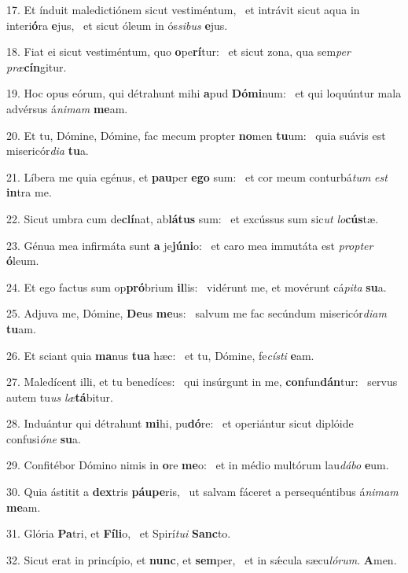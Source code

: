 17. Et índuit maledictiónem sicut vestiméntum, \dag\  et intrávit sicut aqua in interi\textbf{ó}ra \textbf{e}jus, \ast\  et sicut óleum in ós\textit{si}\textit{bus} \textbf{e}jus.\

18. Fiat ei sicut vestiméntum, quo \textbf{o}pe\textbf{rí}tur: \ast\  et sicut zona, qua sem\textit{per} \textit{præ}\textbf{cín}gitur.\

19. Hoc opus eórum, qui détrahunt mihi \textbf{a}pud \textbf{Dó}\textbf{mi}num: \ast\  et qui loquúntur mala advérsus á\textit{ni}\textit{mam} \textbf{me}am.\

20. Et tu, Dómine, Dómine, fac mecum propter \textbf{no}men \textbf{tu}um: \ast\  quia suávis est misericór\textit{di}\textit{a} \textbf{tu}a.\

21. Líbera me quia egénus, et \textbf{pau}per \textbf{e}\textbf{go} sum: \ast\  et cor meum conturbá\textit{tum} \textit{est} \textbf{in}tra me.\

22. Sicut umbra cum de\textbf{clí}nat, ab\textbf{lá}\textbf{tus} sum: \ast\  et excússus sum sic\textit{ut} \textit{lo}\textbf{cús}tæ.\

23. Génua mea infirmáta sunt \textbf{a} je\textbf{jú}\textbf{ni}o: \ast\  et caro mea immutáta est \textit{prop}\textit{ter} \textbf{ó}leum.\

24. Et ego factus sum op\textbf{pró}brium \textbf{il}lis: \ast\  vidérunt me, et movérunt cá\textit{pi}\textit{ta} \textbf{su}a.\

25. Adjuva me, Dómine, \textbf{De}us \textbf{me}us: \ast\  salvum me fac secúndum misericór\textit{di}\textit{am} \textbf{tu}am.\

26. Et sciant quia \textbf{ma}nus \textbf{tu}\textbf{a} hæc: \ast\  et tu, Dómine, fe\textit{cís}\textit{ti} \textbf{e}am.\

27. Maledícent illi, et tu benedíces: \dag\  qui insúrgunt in me, \textbf{con}fun\textbf{dán}tur: \ast\  servus autem tu\textit{us} \textit{læ}\textbf{tá}bitur.\

28. Induántur qui détrahunt \textbf{mi}hi, pu\textbf{dó}re: \ast\  et operiántur sicut diplóide confusi\textit{ó}\textit{ne} \textbf{su}a.\

29. Confitébor Dómino nimis in \textbf{o}re \textbf{me}o: \ast\  et in médio multórum lau\textit{dá}\textit{bo} \textbf{e}um.\

30. Quia ástitit a \textbf{dex}tris \textbf{páu}\textbf{pe}ris, \ast\  ut salvam fáceret a persequéntibus á\textit{ni}\textit{mam} \textbf{me}am.\

31. Glória \textbf{Pa}tri, et \textbf{Fí}\textbf{li}o, \ast\  et Spirí\textit{tu}\textit{i} \textbf{Sanc}to.\

32. Sicut erat in princípio, et \textbf{nunc}, et \textbf{sem}per, \ast\  et in sǽcula sæcu\textit{ló}\textit{rum}. \textbf{A}men.\

